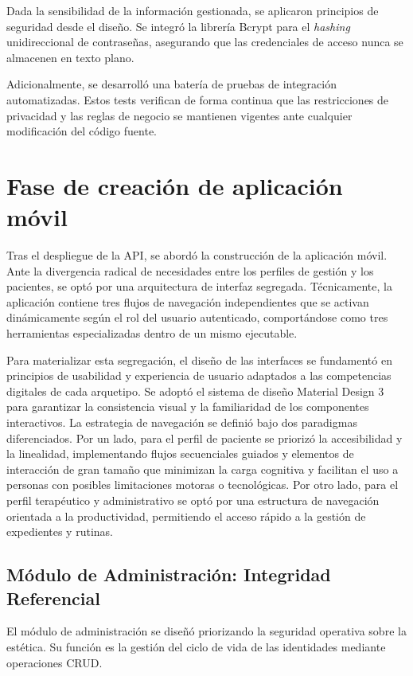 Dada la sensibilidad de la información gestionada, se aplicaron principios de seguridad desde el diseño. Se integró la librería Bcrypt para el \textit{hashing} unidireccional de contraseñas, asegurando que las credenciales de acceso nunca se almacenen en texto plano.

Adicionalmente, se desarrolló una batería de pruebas de integración automatizadas. Estos tests verifican de forma continua que las restricciones de privacidad y las reglas de negocio se mantienen vigentes ante cualquier modificación del código fuente.

\section{Fase de creación de aplicación móvil}

Tras el despliegue de la API, se abordó la construcción de la aplicación móvil. Ante la divergencia radical de necesidades entre los perfiles de gestión y los pacientes, se optó por una arquitectura de interfaz segregada. Técnicamente, la aplicación contiene tres flujos de navegación independientes que se activan dinámicamente según el rol del usuario autenticado, comportándose como tres herramientas especializadas dentro de un mismo ejecutable.

Para materializar esta segregación, el diseño de las interfaces se fundamentó en principios de usabilidad y experiencia de usuario adaptados a las competencias digitales de cada arquetipo. Se adoptó el sistema de diseño Material Design 3 para garantizar la consistencia visual y la familiaridad de los componentes interactivos. La estrategia de navegación se definió bajo dos paradigmas diferenciados. Por un lado, para el perfil de paciente se priorizó la accesibilidad y la linealidad, implementando flujos secuenciales guiados y elementos de interacción de gran tamaño que minimizan la carga cognitiva y facilitan el uso a personas con posibles limitaciones motoras o tecnológicas. Por otro lado, para el perfil terapéutico y administrativo se optó por una estructura de navegación orientada a la productividad, permitiendo el acceso rápido a la gestión de expedientes y rutinas.

\subsection{Módulo de Administración: Integridad Referencial}

El módulo de administración se diseñó priorizando la seguridad operativa sobre la estética. Su función es la gestión del ciclo de vida de las identidades mediante operaciones CRUD.

